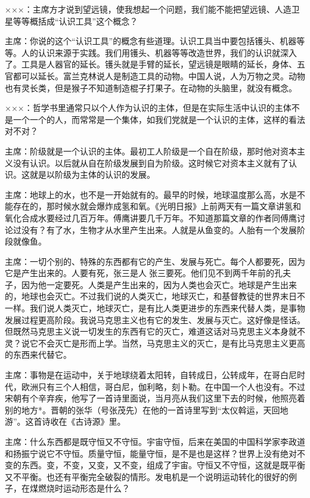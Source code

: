 ×××：主席方才说到望远镜，使我想起一个问题，我们能不能把望远镜、人造卫星等等概括成“认识工具”这个概念？

主席：你说的这个“认识工具”的概念有些道理。认识工具当中要包括镬头、机器等等。人的认识来源于实践。我们用镬头、机器等等改造世界，我们的认识就深入了。工具是人器官的延长。镬头就是手臂的延长，望远镜是眼睛的延长，身体、五官都可以延长。富兰克林说人是制造工具的动物。中国人说，人为万物之灵。动物也有灵长类，但是猴子不知道制造棍子打果子。在动物的头脑里，就没有概念。

×××：哲学书里通常只以个人作为认识的主体，但是在实际生活中认识的主体不是一个一个的人，而常常是一个集体，如我们党就是一个认识的主体，这样的看法对不对？

主席：阶级就是一个认识的主体。最初工人阶级是一个自在阶级，那时他对资本主义没有认识。以后就从自在阶级发展到自为阶级。这时候它对资本主义就有了认识。这就是以阶级为主体的认识的发展。

主席：地球上的水，也不是一开始就有的。最早的时候，地球温度那么高，水是不能存在的，那时候水就会爆炸成氢和氧。《光明日报》上前两天有一篇文章讲氢和氧化合成水要经过几百万年。傅鹰讲要几千万年。不知道那篇文章的作者同傅鹰讨论过没有？有了水，生物才从水里产生出来。人就是从鱼变的。人胎有一个发展阶段就像鱼。

主席：一切个别的、特殊的东西都有它的产生、发展与死亡。每个人都要死，因为它是产生出来的。人要有死，张三是人张三要死。他们见不到两千年前的孔夫子，因为他一定要死。人类是产生出来的，因为人类也会灭亡。地球是产生出来的，地球也会灭亡。不过我们说的人类灭亡，地球灭亡，和基督教徒的世界末日不一样。我们说人类灭亡，地球灭亡，是有比人类更进步的东西来代替人类，是事物发展过程更高阶段。我说马克思主义也有它的发生、发展与灭亡。这好像是怪话。但既然马克思主义说一切发生的东西有它的灭亡，难道这话对马克思主义本身就不灵？说它不会灭亡是形而上学。当然，马克思主义的灭亡，是有比马克思主义更高的东西来代替它。

主席：事物是在运动中，关于地球绕着太阳转，自转成日，公转成年，在哥白尼时代，欧洲只有三个人相信，哥白尼，伽利略，刻卜勒。在中国一个人也没有。不过宋朝有个辛弃疾，他写了一首诗里面说，当月亮从我们这里下去的时候，他照亮着别的地方*。晋朝的张华（号张茂先）在他的一首诗里写到“太仪斡运，天回地游”。这首诗收在《古诗源》里。

主席：什么东西都是既守恒又不守恒。宇宙守恒，后来在美国的中国科学家李政道和扬振宁说它不守恒。质量守恒，能量守恒，是不是也是这样？世界上没有绝对不变的东西。变，不变，又变，又不变，组成了宇宙。守恒又不守恒，这就是既平衡又不平衡。也还有平衡完全破裂的情形。发电机是一个说明运动转化的很好的例子，在煤燃烧时运动形态是什么？

